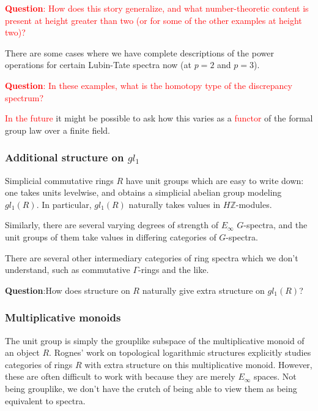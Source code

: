 \documentclass[12pt,titlepage]{article}
\newcommand{\rd}[1]{{\textcolor{red}{#1}}}
\theoremstyle{plain}
\theoremstyle{definition}
\theoremstyle{remark}
\begin{document}
\rd{\textbf{Question}: How does this story generalize, and what number-theoretic content is present at height greater than two (or for some of the other examples at height two)?}

There are some cases where we have complete descriptions of the power operations for certain Lubin-Tate spectra now (at $p=2$ and $p=3$).

\rd{\textbf{Question}: In these examples, what is the homotopy type of the discrepancy spectrum?}

\rd{In the future} it might be possible to ask how this varies as a \rd{functor} of the formal group law over a finite field.

\hypertarget{additional_structure_on__5}{}\subsubsection{{Additional structure on $gl_1$}}\label{additional_structure_on__5}

Simplicial commutative rings $R$ have unit groups which are easy to write down: one takes units levelwise, and obtains a simplicial abelian group modeling $gl_1(R)$. In particular, $gl_1(R)$ naturally takes values in $H\mathbb{Z}$-modules.

Similarly, there are several varying degrees of strength of $E_\infty$ $G$-spectra, and the unit groups of them take values in differing categories of $G$-spectra.

There are several other intermediary categories of ring spectra which we don'{}t understand, such as commutative $\Gamma$-rings and the like.

\textbf{Question}:How does structure on $R$ naturally give extra structure on $gl_1(R)$?

\hypertarget{multiplicative_monoids_6}{}\subsubsection{{Multiplicative monoids}}\label{multiplicative_monoids_6}

The unit group is simply the grouplike subspace of the multiplicative monoid of an object $R$. Rognes'{} work on topological logarithmic structures explicitly studies categories of rings $R$ with extra structure on this multiplicative monoid. However, these are often difficult to work with because they are merely $E_\infty$ spaces. Not being grouplike, we don'{}t have the crutch of being able to view them as being equivalent to spectra.
\end{document}
